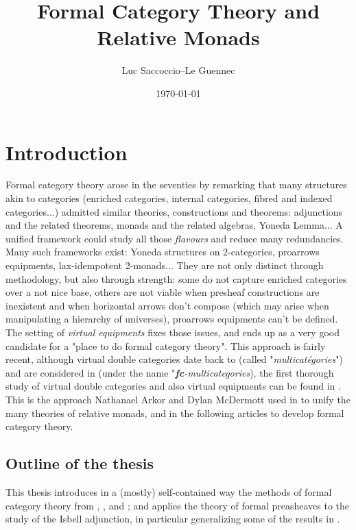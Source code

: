 \documentclass[10pt,a4paper]{article}
\theoremstyle{plain}
\theoremstyle{definition}
\theoremstyle{remark}
\begin{document}
\title{Formal Category Theory and Relative Monads}
\author{Luc Saccoccio--Le Guennec}
\date{\today}

\maketitle

\tableofcontents
\noindent\hrulefill

\section{Introduction}

Formal category theory arose in the seventies by remarking that many structures akin to categories (enriched categories, internal categories, fibred and indexed categories...) admitted similar theories, constructions and theorems: adjunctions and the related theorems, monads and the related algebras, Yoneda Lemma... A unified framework could study all those \textit{flavours} and reduce many redundancies. Many such frameworks exist: Yoneda structures on 2-categories, proarrows equipments, lax-idempotent 2-monads... They are not only distinct through methodology, but also through strength: some do not capture enriched categories over a not nice base, others are not viable when presheaf constructions are inexistent and when horizontal arrows don't compose (which may arise when manipulating a hierarchy of universes), proarrows equipments can't be defined. The setting of \textit{virtual equipments} fixes those issues, and ends up as a very good candidate for a "place to do formal category theory". This approach is fairly recent, although virtual double categories date back to \cite{Burroni1971} (called "\textit{multicatégories}") and are considered in \cite{leinster} (under the name "\textit{\textbf{fc}-multicategories}), the first thorough study of virtual double categories and also virtual equipments can be found in \cite{cs10}. This is the approach Nathanael Arkor and Dylan McDermott used in \cite{arkor2024formaltheoryrelativemonads} to unify the many theories of relative monads, and in the following articles to develop formal category theory.

\subsection{Outline of the thesis}

This thesis introduces in a (mostly) self-contained way the methods of formal category theory from \cite{arkor2024formaltheoryrelativemonads}, \cite{arkor2024nervetheoremrelativemonads}, \cite{arkor2025relativemonadicity} and \cite{arkor2026presheavescocompletionsformalcategory}; and applies the theory of formal preasheaves to the study of the Isbell adjunction, in particular generalizing some of the results in \cite{averyleinster}.
\end{document}
